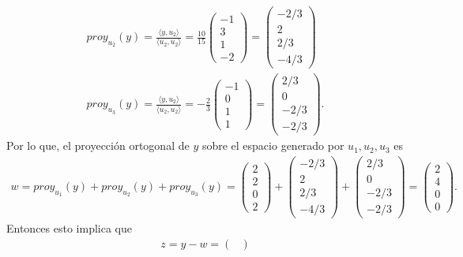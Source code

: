 \documentclass[11pt,letterpaper]{article}
\begin{document}
\begin{itemize}
\begin{align*}
proy_{u_2}(y)=\frac{\langle y, u_2 \rangle}{\langle u_2,u_2 \rangle}=\frac{10}{15}\begin{pmatrix}-1\\3\\1\\-2 \end{pmatrix}=\begin{pmatrix} -2/3\\ 2\\2/3\\-4/3\end{pmatrix}\\
proy_{u_3}(y)=\frac{\langle y, u_2 \rangle}{\langle u_2,u_2 \rangle}=-\frac{2}{3}\begin{pmatrix}-1\\0\\1\\1 \end{pmatrix}=\begin{pmatrix} 2/3\\0\\-2/3\\-2/3 \end{pmatrix}.
\end{align*}
Por lo que, el proyección ortogonal de $y$ sobre el espacio generado por $u_1,u_2, u_3$ es
\begin{align*}
w = proy_{u_1}(y) + proy_{u_2}(y)+proy_{u_3}(y)=\begin{pmatrix} 2\\2\\0\\2 \end{pmatrix}+\begin{pmatrix} -2/3\\ 2\\2/3\\-4/3\end{pmatrix}+\begin{pmatrix} 2/3\\0\\-2/3\\-2/3 \end{pmatrix}=\begin{pmatrix}
2\\ 4 \\ 0 \\ 0
\end{pmatrix}.
\end{align*}
Entonces esto implica que 
\begin{align*}
z= y-w=\begin{pmatrix}

\end{pmatrix}
\end{align*}
\end{itemize}
\end{document}
